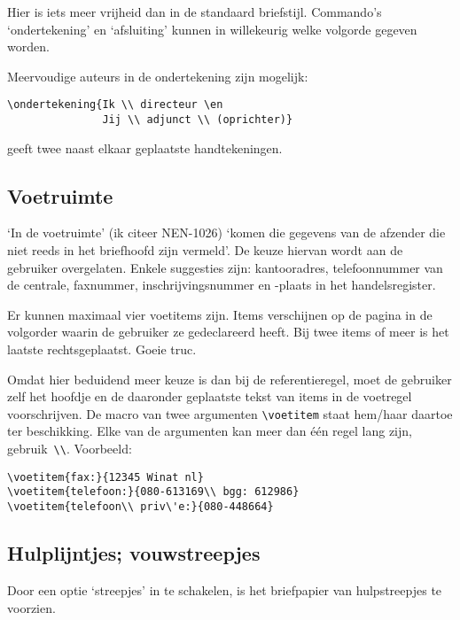 \documentclass[a4paper,10pt]{artikel1}
\begin{document}
Hier is iets meer vrijheid dan in de standaard briefstijl.  Commando's
`ondertekening' en `afsluiting' kunnen in willekeurig welke volgorde
gegeven worden.
 
Meervoudige auteurs in de ondertekening zijn mogelijk:
\begin{verbatim}
\ondertekening{Ik \\ directeur \en
               Jij \\ adjunct \\ (oprichter)}
\end{verbatim}
geeft twee naast elkaar geplaatste handtekeningen.
 
\subsection{Voetruimte}
 
`In de voetruimte' (ik citeer NEN-1026) `komen die gegevens van de
afzender die niet reeds in het briefhoofd zijn vermeld'. De keuze
hiervan wordt aan de gebruiker overgelaten.  Enkele suggesties zijn:
kantooradres, telefoonnummer van de centrale, faxnummer,
inschrijvingsnummer en -plaats in het handelsregister.
 
Er kunnen maximaal vier voetitems zijn.  Items verschijnen op de
pagina in de volgorder waarin de gebruiker ze gedeclareerd heeft.  Bij
twee items of meer is het laatste rechtsgeplaatst. Goeie truc.
 
Omdat hier beduidend meer keuze is dan bij de referentieregel, moet de
gebruiker zelf het hoofdje en de daaronder geplaatste tekst van items
in de voetregel voorschrijven.  De macro van twee argumenten
\verb.\voetitem. staat hem/haar daartoe ter beschikking. Elke van de
argumenten kan meer dan \'e\'en regel lang zijn, gebruik~\verb.\\..
Voorbeeld:
\begin{verbatim}
\voetitem{fax:}{12345 Winat nl}
\voetitem{telefoon:}{080-613169\\ bgg: 612986}
\voetitem{telefoon\\ priv\'e:}{080-448664}
\end{verbatim}
 
\subsection{Hulplijntjes; vouwstreepjes}
 
Door een optie `streepjes' in te schakelen, is het briefpapier van
hulpstreepjes te voorzien.
 
\end{document}
